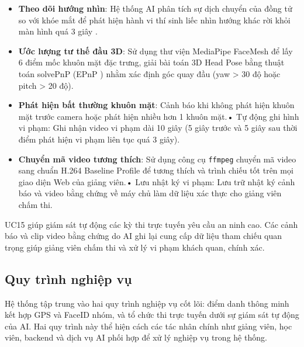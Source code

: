 \documentclass[../DoAn.tex]{subfiles}
\begin{document}
\begin{itemize}

    \item \textbf{Theo dõi hướng nhìn}: Hệ thống AI phân tích sự dịch chuyển của đồng tử so với khóe mắt để phát hiện hành vi thí sinh liếc nhìn hướng khác rời khỏi màn hình quá 3 giây \cite{kaundinya2026inbrowser}.

    \item \textbf{Ước lượng tư thế đầu 3D}: Sử dụng thư viện MediaPipe FaceMesh \cite{Lugaresi2019MediaPipe} để lấy 6 điểm mốc khuôn mặt đặc trưng, giải bài toán 3D Head Pose bằng thuật toán solvePnP (EPnP \cite{Lepetit2009EPnP}) nhằm xác định góc quay đầu (yaw > 30 độ hoặc pitch > 20 độ).

    \item \textbf{Phát hiện bất thường khuôn mặt}: Cảnh báo khi không phát hiện khuôn mặt trước camera hoặc phát hiện nhiều hơn 1 khuôn mặt.\newline • Tự động ghi hình vi phạm: Ghi nhận video vi phạm dài 10 giây (5 giây trước và 5 giây sau thời điểm phát hiện vi phạm liên tục quá 3 giây).

    \item \textbf{Chuyển mã video tương thích}: Sử dụng công cụ \texttt{ffmpeg} chuyển mã video sang chuẩn H.264 Baseline Profile để tương thích và trình chiếu tốt trên mọi giao diện Web của giảng viên.\newline • Lưu nhật ký vi phạm: Lưu trữ nhật ký cảnh báo và video bằng chứng về máy chủ làm dữ liệu xác thực cho giảng viên chấm thi.

\end{itemize}

UC15 giúp giám sát tự động các kỳ thi trực tuyến yêu cầu an ninh cao. Các cảnh báo và clip video bằng chứng do AI ghi lại cung cấp dữ liệu tham chiếu quan trọng giúp giảng viên chấm thi và xử lý vi phạm khách quan, chính xác.

\subsection{Quy trình nghiệp vụ}

\label{subsection:2.2.3}

Hệ thống tập trung vào hai quy trình nghiệp vụ cốt lõi: điểm danh thông minh kết hợp GPS và FaceID nhóm, và tổ chức thi trực tuyến dưới sự giám sát tự động của AI. Hai quy trình này thể hiện cách các tác nhân chính như giảng viên, học viên, backend và dịch vụ AI phối hợp để xử lý nghiệp vụ trong hệ thống.
\end{document}
